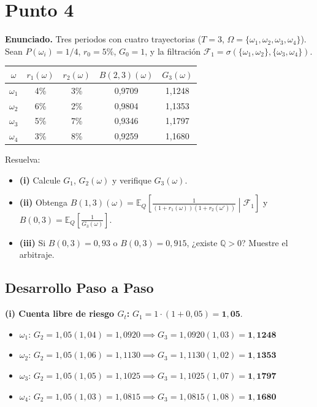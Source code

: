 \documentclass[11pt, a4paper]{article}
\begin{document}
\newpage

\section*{Punto 4}
\textbf{Enunciado.} Tres periodos con cuatro trayectorias ($T=3$, $\Omega=\{\omega_1,\omega_2,\omega_3,\omega_4\}$). Sean $P(\omega_i) = 1/4$, $r_0 = 5\%$, $G_0 = 1$, y la filtración $\mathcal{F}_1 = \sigma(\{\omega_1, \omega_2\}, \{\omega_3, \omega_4\})$.

\begin{center}
\begin{tabular}{ccccc}
\toprule
$\omega$ & $r_1(\omega)$ & $r_2(\omega)$ & $B(2,3)(\omega)$ & $G_3(\omega)$ \\
\midrule
$\omega_1$ & 4\% & 3\% & 0{,}9709 & 1{,}1248 \\
$\omega_2$ & 6\% & 2\% & 0{,}9804 & 1{,}1353 \\
$\omega_3$ & 5\% & 7\% & 0{,}9346 & 1{,}1797 \\
$\omega_4$ & 3\% & 8\% & 0{,}9259 & 1{,}1680 \\
\bottomrule
\end{tabular}
\end{center}

Resuelva:
\begin{itemize}
    \item \textbf{(i)} Calcule $G_1$, $G_2(\omega)$ y verifique $G_3(\omega)$.
    \item \textbf{(ii)} Obtenga $B(1,3)(\omega) = \mathbb{E}_Q \left[ \frac{1}{(1+r_1(\omega))(1+r_2(\omega'))} \middle| \mathcal{F}_1 \right]$ y $B(0,3) = \mathbb{E}_Q \left[ \frac{1}{G_3(\omega)} \right]$.
    \item \textbf{(iii)} Si $B(0,3) = 0{,}93$ o $B(0,3) = 0{,}915$, ¿existe $\mathbb{Q} > 0$? Muestre el arbitraje.
\end{itemize}

\subsection*{Desarrollo Paso a Paso}

\textbf{(i) Cuenta libre de riesgo $G_t$:}
$G_1 = 1 \cdot (1 + 0{,}05) = \mathbf{1{,}05}$.
\begin{itemize}
    \item $\omega_1$: $G_2 = 1{,}05(1{,}04) = 1{,}0920 \implies G_3 = 1{,}0920(1{,}03) = \mathbf{1{,}1248}$ \quad \checkmark
    \item $\omega_2$: $G_2 = 1{,}05(1{,}06) = 1{,}1130 \implies G_3 = 1{,}1130(1{,}02) = \mathbf{1{,}1353}$ \quad \checkmark
    \item $\omega_3$: $G_2 = 1{,}05(1{,}05) = 1{,}1025 \implies G_3 = 1{,}1025(1{,}07) = \mathbf{1{,}1797}$ \quad \checkmark
    \item $\omega_4$: $G_2 = 1{,}05(1{,}03) = 1{,}0815 \implies G_3 = 1{,}0815(1{,}08) = \mathbf{1{,}1680}$ \quad \checkmark
\end{itemize}
\end{document}
